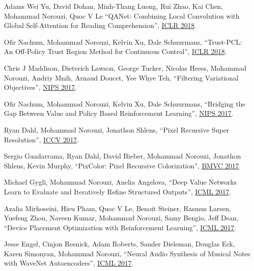 \documentclass[10pt,letterpaper]{article}
\renewenvironment{itemize}{
  \begin{list}{}{
    \setlength{\leftmargin}{1.5em}
  }
}{
  \end{list}
}
\begin{document}
\begin{itemize}
\item Adams Wei Yu, David Dohan, Minh-Thang Luong, Rui Zhao, Kai Chen, Mohammad Norouzi, Quoc V Le
``QANet: Combining Local Convolution with Global Self-Attention for Reading Comprehension'',
\href{https://arxiv.org/pdf/1804.09541.pdf}%
{ICLR 2018}.

\item Ofir Nachum, Mohammad Norouzi, Kelvin Xu, Dale Schuurmans,
``Trust-PCL: An Off-Policy Trust Region Method for Continuous Control'',
\href{https://arxiv.org/pdf/1707.01891}%
{ICLR 2018}.

\item Chris J Maddison, Dieterich Lawson, George Tucker, Nicolas Heess, Mohammad Norouzi, Andriy Mnih, Arnaud Doucet, Yee Whye Teh,
``Filtering Variational Objectives'',
\href{https://arxiv.org/pdf/1705.09279}%
{NIPS 2017}.

\item Ofir Nachum, Mohammad Norouzi, Kelvin Xu, Dale Schuurmans,
``Bridging the Gap Between Value and Policy Based Reinforcement Learning'',
\href{https://arxiv.org/pdf/1702.08892}%
{NIPS 2017}.

\item Ryan Dahl, Mohammad Norouzi, Jonathon Shlens,
``Pixel Recursive Super Resolution'',
\href{https://arxiv.org/pdf/1702.00783}%
{ICCV 2017}.

\item Sergio Guadarrama, Ryan Dahl, David Bieber, Mohammad Norouzi, Jonathon Shlens, Kevin Murphy,
``PixColor: Pixel Recursive Colorization'',
\href{https://arxiv.org/pdf/1705.07208}%
{BMVC 2017}.

\item Michael Gygli, Mohammad Norouzi, Anelia Angelova,
``Deep Value Networks Learn to Evaluate and Iteratively Refine Structured Outputs'',
\href{https://arxiv.org/pdf/1703.04363}%
{ICML 2017}.

\item Azalia Mirhoseini, Hieu Pham, Quoc V Le, Benoit Steiner, Rasmus Larsen, Yuefeng Zhou, Naveen Kumar, Mohammad Norouzi, Samy Bengio, Jeff Dean,
``Device Placement Optimization with Reinforcement Learning'',
\href{https://arxiv.org/pdf/1706.04972.pdf}%
{ICML 2017}.

\item Jesse Engel, Cinjon Resnick, Adam Roberts, Sander Dieleman, Douglas Eck, Karen Simonyan, Mohammad Norouzi,
``Neural Audio Synthesis of Musical Notes with WaveNet Autoencoders'',
\href{https://arxiv.org/pdf/1704.01279}%
{ICML 2017}.


\end{itemize}
\end{document}
